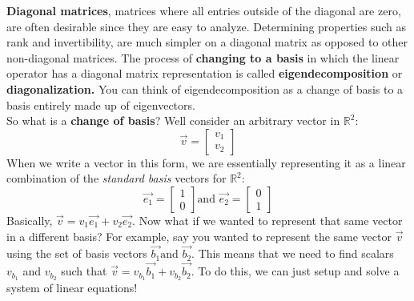


\textbf{Diagonal matrices}, matrices where all entries outside of the diagonal are zero, are often desirable since they are easy to analyze. 
Determining properties such as rank and invertibility, are much simpler on a diagonal matrix as opposed to other non-diagonal matrices.
The process of \textbf{changing to a basis} in which the linear operator has a diagonal matrix representation is called \textbf{eigendecomposition} or \textbf{diagonalization.} You can think of eigendecomposition as a change of basis to a basis entirely made up of eigenvectors.
\\

So what is a \textbf{change of basis}? Well consider an arbitrary vector in $\mathbb{R}^2$: $$\vec{v} = \begin{bmatrix}v_1 \\ v_2 \end{bmatrix}$$
When we write a vector in this form, we are essentially representing it as a linear combination of the \textit{standard basis} vectors for $\mathbb{R}^2:$ $$\vec{e_1} = \begin{bmatrix} 1 \\ 0 \end{bmatrix} \text{and } \vec{e_2} = \begin{bmatrix}0 \\ 1 \end{bmatrix}$$
Basically, $\vec{v} = v_1\vec{e_1} + v_2\vec{e_2}$. Now what if we wanted to represent that same vector in a different basis? 
For example, say you wanted to represent the same vector $\vec{v}$ using the set of basis vectors $\vec{b_1} \text{and } \vec{b_2} $.
This means that we need to find scalars $v_{b_1}$ and $v_{b_2}$ such that $\vec{v} = v_{b_1}\vec{b_1} + v_{b_2}\vec{b_2}$. 
To do this, we can just setup and solve a system of linear equations!\\

